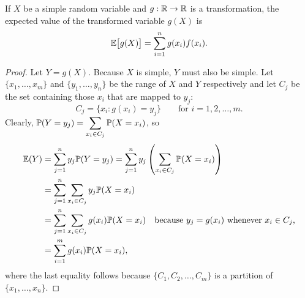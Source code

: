\begin{theorem}\label{thm:expe-simple-transformed}
If $X$ be a simple random variable and $g:\mathbb{R}\to\mathbb{R}$ is a transformation, the expected value of the transformed variable $g(X)$ is
\[
\mathbb{E}\big[g(X)\big] = \sum_{i=1}^{n} g(x_i) f(x_i).
\]
\end{theorem}
\begin{proof}
Let $Y=g(X)$. Because $X$ is simple, $Y$ must also be simple. Let $\{x_1,\ldots,x_m\}$ and $\{y_1,\ldots,y_n\}$ be the range of $X$ and $Y$ respectively and let $C_j$ be the set containing those $x_i$ that are mapped to $y_j$:
\[
C_j  = \{x_i:g(x_i)=y_j\} \qquad\text{for $i=1,2,\ldots,m$.}
\]
Clearly, $\mathbb{P}(Y=y_j) = \displaystyle\sum_{x_i\in C_j}\mathbb{P}(X=x_i)$, so
\begin{align*}
\mathbb{E}(Y)
	& = \sum_{j=1}^n y_j\mathbb{P}(Y=y_j) = \sum_{j=1}^n y_j\left(\sum_{x_i\in C_j} \mathbb{P}(X=x_i)\right) \\
	& = \sum_{j=1}^n \sum_{x_i\in C_j} y_j\mathbb{P}(X=x_i) \\
	& = \sum_{j=1}^n \sum_{x_i\in C_j} g(x_i)\mathbb{P}(X=x_i) \text{\quad because $y_j=g(x_i)$ whenever $x_i\in C_j$,}\\
	& = \sum_{i=1}^m g(x_i)\mathbb{P}(X=x_i),
\end{align*}
where the last equality follows because $\{C_1,C_2,\ldots,C_m\}$ is a partition of $\{x_1,\ldots,x_n\}$.
\end{proof}
